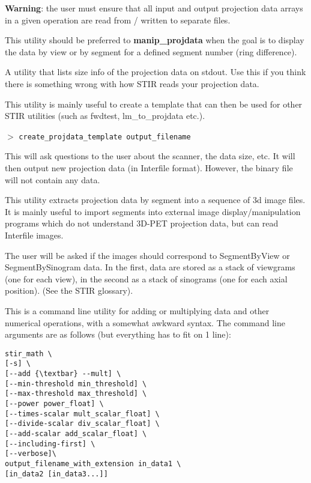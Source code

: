 \documentclass{article}
\newcommand{\cmdline}[1]{\par \noindent $>$ \texttt{#1}\par}
\begin{document}
\textbf{Warning}: the user must ensure that all input and output projection 
data arrays in a given operation are read from / written to separate 
files.

{ 
}

This utility should be preferred to \textbf{manip\_projdata} when the 
goal is to display the data by view or by segment for a defined 
segment number (ring difference).

{ 
}

A utility that lists size info of the projection data on stdout. 
Use this if you think there is something wrong with how STIR 
reads your projection data.

{ 
}

This utility is mainly useful to create a template that can then 
be used for other STIR utilities (such as fwdtest, lm\_to\_projdata 
etc.).
\cmdline{create\_projdata\_template output\_filename}

This will ask questions to the user about the scanner, the data 
size, etc. It will then output new projection data (in Interfile 
format). However, the binary file will not contain any data.

{ 
}

This utility extracts projection data by segment into a sequence 
of 3d image files. It is mainly useful to import segments into 
external image display/manipulation programs which do not understand 
3D-PET projection data, but can read Interfile images.


The user will be asked if the images should correspond to SegmentByView 
or SegmentBySinogram data. In the first, data are stored as a 
stack of viewgrams (one for each view), in the second as a stack 
of sinograms (one for each axial position). (See the STIR glossary).

{ 
}
\label{sec:stir_math}

This is a command line utility for adding or multiplying data 
and other numerical operations, with a somewhat awkward syntax. 
The command line arguments are as follows (but everything has 
to fit on 1 line):
\begin{verbatim}
stir_math \
[-s] \
[--add {\textbar} --mult] \
[--min-threshold min_threshold] \
[--max-threshold max_threshold] \
[--power power_float] \
[--times-scalar mult_scalar_float] \
[--divide-scalar div_scalar_float] \
[--add-scalar add_scalar_float] \
[--including-first] \
[--verbose]\
output_filename_with_extension in_data1 \
[in_data2 [in_data3...]]
\end{verbatim}
\end{document}

